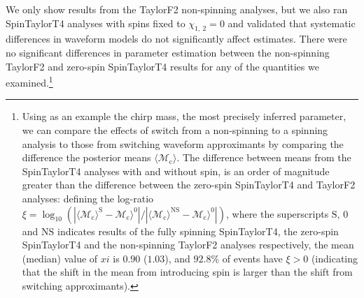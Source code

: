 We only show results from the TaylorF2 non-spinning analyses, but we also ran SpinTaylorT4 analyses with spins fixed to $\chi_{1,~2}=0$ and validated that systematic differences in waveform models do not significantly affect estimates. There were no significant differences in parameter estimation between the non-spinning TaylorF2 and zero-spin SpinTaylorT4 results for any of the quantities we examined.\footnote{Using as an example the chirp mass, the most precisely inferred parameter, we can compare the effects of switch from a non-spinning to a spinning analysis to those from switching waveform approximants by comparing the difference the posterior means $\langle \mathcal{M}_\mathrm{c}\rangle$. The difference between means from the SpinTaylorT4 analyses with and without spin, is an order of magnitude greater than the difference between the zero-spin SpinTaylorT4 and TaylorF2 analyses: defining the log-ratio $\xi = \log_{10}(|\langle \mathcal{M}_\mathrm{c}\rangle^\mathrm{S} - \mathcal{M}_\mathrm{c}\rangle^0|/|\langle \mathcal{M}_\mathrm{c}\rangle^\mathrm{NS} - \mathcal{M}_\mathrm{c}\rangle^0|)$, where the superscripts $\mathrm{S}$, $0$ and $\mathrm{NS}$ indicates results of the fully spinning SpinTaylorT4, the zero-spin SpinTaylorT4 and the non-spinning TaylorF2 analyses respectively, the mean (median) value of $xi$ is $0.90$ ($1.03$), and $92.8\%$ of events have $\xi > 0$ (indicating that the shift in the mean from introducing spin is larger than the shift from switching approximants).}
  
  
  
  
  
  
  
  
  
  
  
  
  
  
  